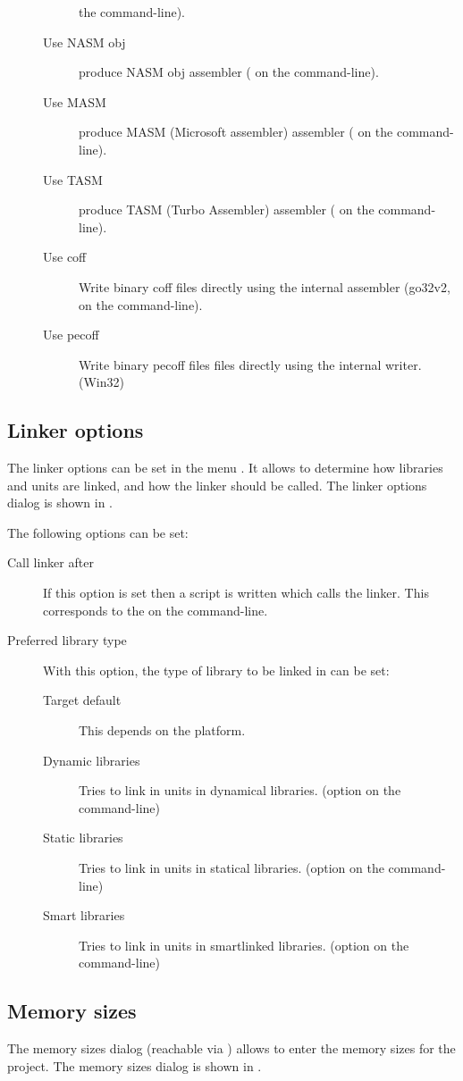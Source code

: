 \begin{description}
\begin{description}
the command-line).
\item[Use NASM obj] produce NASM obj assembler ( on the
command-line).
\item[Use MASM] produce MASM (Microsoft assembler) assembler ( on the
command-line).
\item[Use TASM] produce TASM (Turbo Assembler) assembler ( on the
command-line).
\item[Use coff] Write binary coff files directly using the internal
assembler (go32v2,  on the command-line).
\item[Use pecoff] Write binary pecoff files files directly using the
internal writer. (Win32)
\end{description}
\end{description}
%
%
\subsection{Linker options}
The linker options can be set in the menu . It allows
to determine how libraries and units are linked, and how the linker should
be called. 
The linker options dialog is shown in .


The following options can be set:
\begin{description}
\item[Call linker after] If this option is set then a script is written
which calls the linker. This corresponds to the  on the
command-line.
\item[Preferred library type] With this option, the type of library to be
linked in can be set:
\begin{description}
\item[Target default] This depends on the platform.
\item[Dynamic libraries] Tries to link in units in dynamical libraries. 
(option  on the command-line)
\item[Static libraries] Tries to link in units in statical libraries.
(option  on the command-line)
\item[Smart libraries] Tries to link in units in smartlinked libraries.
(option  on the command-line)
\end{description}
\end{description}
%
%
\subsection{Memory sizes}
The memory sizes dialog (reachable via ) allows 
to enter the memory sizes for the project.
The memory sizes dialog is shown in .

